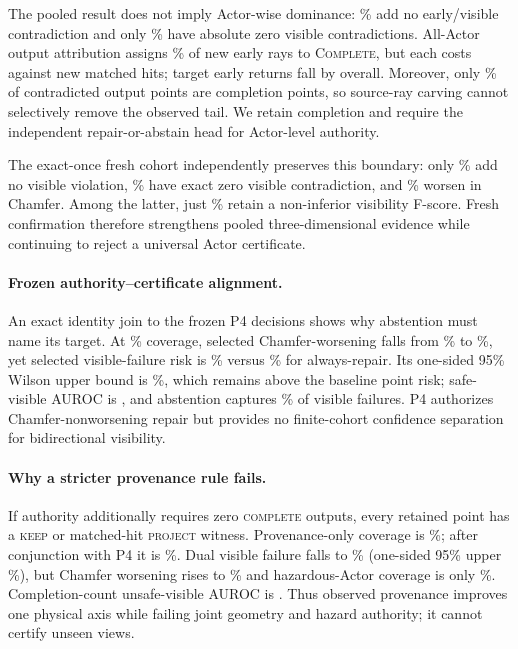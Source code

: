 The pooled result does not imply Actor-wise dominance: \PthreeCNonnewActors{}\% add no early/visible contradiction and only
\PthreeCZeroActors{}\% have absolute zero visible contradictions. All-Actor output attribution assigns
\PthreeDCompletionNewEarly{}\% of new early rays to \textsc{Complete}, but each costs against \PthreeDCompletionGain{} new matched
hits; target early returns fall by \PthreeDNetEarlyReduction{} overall. Moreover, only \PthreeDCompletionContradiction{}\% of
contradicted output points are completion points, so source-ray carving cannot selectively remove the observed tail. We retain
completion and require the independent repair-or-abstain head for Actor-level authority.

The exact-once fresh cohort independently preserves this boundary: only \PthreeFreshNonnewActors{}\% add no visible
violation, \PthreeFreshZeroActors{}\% have exact zero visible contradiction, and \PthreeFreshChamferWorse{}\% worsen in
Chamfer. Among the latter, just \PthreeFreshWorseFscoreNoninferior{}\% retain a non-inferior visibility F-score. Fresh
confirmation therefore strengthens pooled three-dimensional evidence while continuing to reject a universal Actor certificate.

\paragraph{Frozen authority--certificate alignment.}
An exact identity join to the frozen P4 decisions shows why abstention must name its target. At \PtenPfourCoverage{}\%
coverage, selected Chamfer-worsening falls from \PtenAlwaysChamferWorse{}\% to \PtenSelectedChamferWorse{}\%, yet selected
visible-failure risk is \PtenSelectedVisibleRisk{}\% versus \PtenAlwaysVisibleRisk{}\% for always-repair. Its one-sided
95\% Wilson upper bound is \PtenSelectedVisibleUpper{}\%, which remains above the baseline point risk; safe-visible AUROC is
\PtenVisibleSafeAUROC{}, and abstention captures \PtenVisibleCapture{}\% of visible failures. P4 authorizes
Chamfer-nonworsening repair but provides no finite-cohort confidence separation for bidirectional visibility.

\paragraph{Why a stricter provenance rule fails.}
If authority additionally requires zero \textsc{complete} outputs, every retained point has a \textsc{keep} or matched-hit
\textsc{project} witness. Provenance-only coverage is \PelevenProvenanceCoverage{}\%; after conjunction with P4 it is
\PelevenDualCoverage{}\%. Dual visible failure falls to \PelevenDualVisibleRisk{}\% (one-sided 95\% upper
\PelevenDualVisibleUpper{}\%), but Chamfer worsening rises to \PelevenDualChamferWorse{}\% and hazardous-Actor coverage is only
\PelevenDualHazardCoverage{}\%. Completion-count unsafe-visible AUROC is \PelevenCompletionUnsafeAUROC{}. Thus observed
provenance improves one physical axis while failing joint geometry and hazard authority; it cannot certify unseen views.

